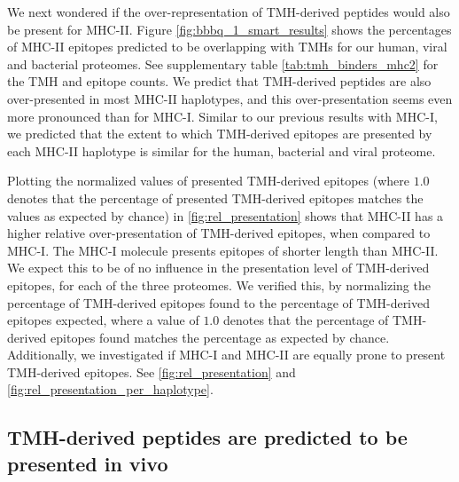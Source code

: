 We next wondered if the over-representation of TMH-derived peptides would also be present for MHC-II. 
Figure \ref{fig:bbbq_1_smart_results} shows the percentages of MHC-II epitopes predicted to be overlapping 
with TMHs for our human, viral and bacterial proteomes.
See supplementary table \ref{tab:tmh_binders_mhc2} 
for the TMH and epitope counts.
We predict that TMH-derived peptides are also over-presented in most MHC-II haplotypes, and this over-presentation seems even more pronounced than for MHC-I. 
Similar to our previous results with MHC-I, we predicted that the extent to which TMH-derived
epitopes are presented by each MHC-II haplotype is similar for the human, bacterial and viral proteome.


Plotting the normalized values of presented TMH-derived epitopes (where
$1.0$ denotes that the percentage of presented TMH-derived epitopes
matches the values as expected by chance) in \ref{fig:rel_presentation}
shows that MHC-II has a higher relative over-presentation of TMH-derived
epitopes, when compared to MHC-I.
The MHC-I molecule presents epitopes of shorter length than MHC-II.
We expect this to be of no influence in the presentation level
of TMH-derived epitopes, for each of the three proteomes.
We verified this, by normalizing the percentage of TMH-derived epitopes found
to the percentage of TMH-derived epitopes expected, 
where a value of $1.0$ denotes that the percentage of TMH-derived epitopes found
matches the percentage as expected by chance.
Additionally, we investigated if MHC-I and MHC-II are equally prone
to present TMH-derived epitopes. 
See \ref{fig:rel_presentation} and \ref{fig:rel_presentation_per_haplotype}.

\subsection{TMH-derived peptides are predicted to be presented in vivo}

